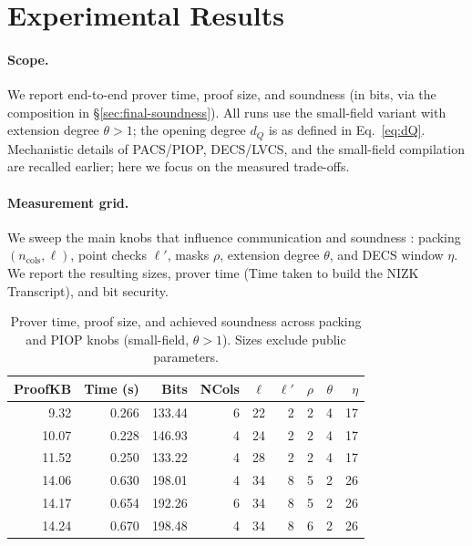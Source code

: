 \section{Experimental Results}\label{sec:results}

\paragraph{Scope.}
We report end-to-end prover time, proof size, and soundness (in bits, via the composition in \S\ref{sec:final-soundness}).
All runs use the small-field variant with extension degree $\theta>1$; the opening degree $d_Q$ is as defined in Eq.~\eqref{eq:dQ}.
Mechanistic details of PACS/PIOP, DECS/LVCS, and the small-field compilation are recalled earlier; here we focus on the measured trade-offs.

\paragraph{Measurement grid.}
We sweep the main knobs that influence communication and soundness : packing $(n_{\text{cols}},\ell)$, point checks $\ell'$, masks $\rho$, extension degree $\theta$, and DECS window $\eta$. We report the resulting sizes, prover time (Time taken to build the NIZK Transcript), and bit security.

\begin{table}[h]
\centering
\footnotesize
\setlength{\tabcolsep}{4pt}
\begin{tabular}{r r r r r r r r r}
\toprule
\textbf{ProofKB} & \textbf{Time (s)} & \textbf{Bits} & \textbf{NCols} & $\ell$ & $\ell'$ & $\rho$ & $\theta$ & $\eta$\\
\midrule
\ \ 9.32 & 0.266 & 133.44 & 6 & 22 & 2 & 2 & 4 & 17 \\
10.07 & 0.228 & 146.93 & 4 & 24 & 2 & 2 & 4 & 17 \\
11.52 & 0.250 & 133.22 & 4 & 28 & 2 & 2 & 4 & 17 \\
\midrule[1.2pt]
14.06 & 0.630 & 198.01 & 4 & 34 & 8 & 5 & 2 & 26 \\
14.17 & 0.654 & 192.26 & 6 & 34 & 8 & 5 & 2 & 26 \\
14.24 & 0.670 & 198.48 & 4 & 34 & 8 & 6 & 2 & 26 \\
\bottomrule
\end{tabular}
\caption{Prover time, proof size, and achieved soundness across packing and PIOP knobs (small-field, $\theta>1$). Sizes exclude public parameters.}
\label{tab:results-grid}
\end{table}

